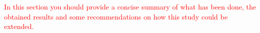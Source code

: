 \textcolor{red}{In this section you should provide a concise summary of what has been done, the obtained results and some recommendations on how this study could be extended.}

\lipsum[4]